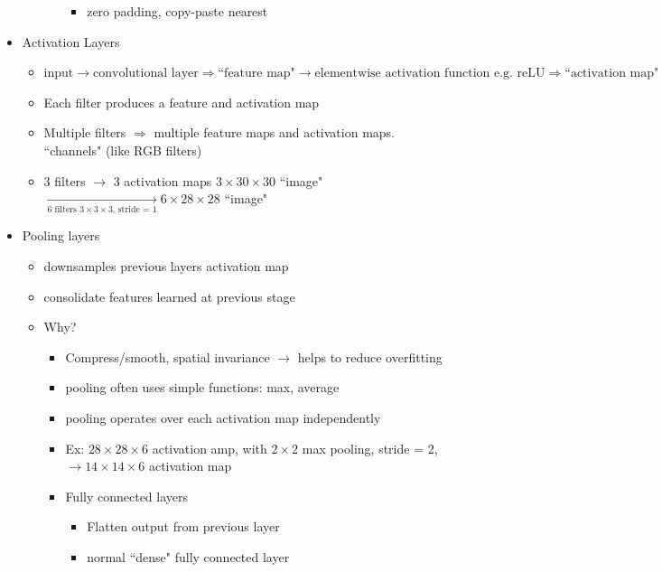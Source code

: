 \documentclass[10pt, oneside]{article}
\begin{document}
\begin{itemize}
\begin{itemize}
\begin{itemize}
            \begin{itemize}
                \item zero padding, copy-paste nearest
            \end{itemize}
        \end{itemize}
    \end{itemize}
    \item Activation Layers
    \begin{itemize}
        \item $\text{input} \rightarrow \text{convolutional layer} \Rightarrow \text{``feature map"} \rightarrow \text{elementwise activation function e.g. reLU} \Rightarrow \text{``activation map"}$
        \item Each filter produces a feature and activation map
        \item Multiple filters $\Rightarrow$ multiple feature maps and activation maps. ``channels" (like RGB filters)
        \item 3 filters $\rightarrow$ 3 activation maps $3\times 30\times 30$ ``image" $\underset{\text{6 filters $3\times 3\times 3$, stride = 1}}{\rightarrow} 6\times 28\times 28$ ``image" 
    \end{itemize}
    \item Pooling layers
    \begin{itemize}
        \item downsamples previous layers activation map
        \item consolidate features learned at previous stage
        \item Why?
        \begin{itemize}
            \item Compress/smooth, spatial invariance $\rightarrow$ helps to reduce overfitting
            \item pooling often uses simple functions: max, average
            \item pooling operates over each activation map independently
            \item Ex: $28\times 28 \times 6$ activation amp, with $2\times 2 $ max pooling, stride = 2, $\rightarrow 14\times 14 \times 6$ activation map
            \item Fully connected layers
            \begin{itemize}
                \item Flatten output from previous layer
                \item normal ``dense" fully connected layer

\end{itemize}
\end{itemize}
\end{itemize}
\end{itemize}
\end{document}
